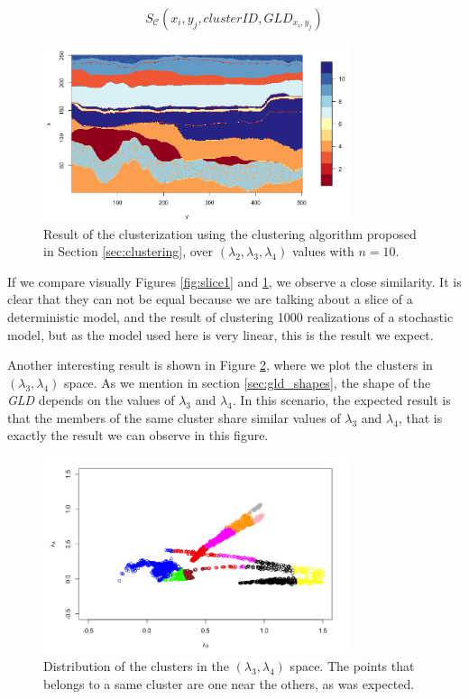 \begin{equation}\label{eq:clustersresult}
S_{\mathcal{C}}(x_{i},y_{j},clusterID, GLD_{x_{i},y_{j}})
\end{equation}

\begin{figure}[H]
    \centering
    \includegraphics[width=0.8\textwidth]{images/clusters1.png}
    \caption{Result of the clusterization using the clustering algorithm proposed in Section \ref{sec:clustering}, over $(\lambda_{2}, \lambda_{3}, \lambda_{4})$ values with $n=10$.}
    \label{fig:clusters}
\end{figure}

If we compare visually Figures \ref{fig:slice1} and \ref{fig:clusters}, we observe a close similarity. It is clear that they can not be equal because we are talking about a slice of a deterministic model, and the result of clustering 1000 realizations of a stochastic model, but as the model used here is very linear, this is the result we expect.

Another interesting result is shown in Figure \ref{fig:clusters_lambda3_lambda4_space}, where we plot the clusters in $(\lambda_{3}, \lambda_{4})$ space. As we mention in section \ref{sec:gld_shapes}, the shape of the \textit{GLD} depends on the values of $\lambda_{3}$ and $\lambda_{4}$. In this scenario, the expected result is that the members of the same cluster share similar values of $\lambda_{3}$ and $\lambda_{4}$, that is exactly the result we can observe in this figure. 

\begin{figure}[H]
    \centering
    \includegraphics[width=0.8\textwidth]{images/Clusters_lambda3_lambda4.png}
    \caption{Distribution of the clusters in the $(\lambda_{3}, \lambda_{4})$ space. The points that belongs to a same cluster are one near the others, as was expected.}
    \label{fig:clusters_lambda3_lambda4_space}
\end{figure}

